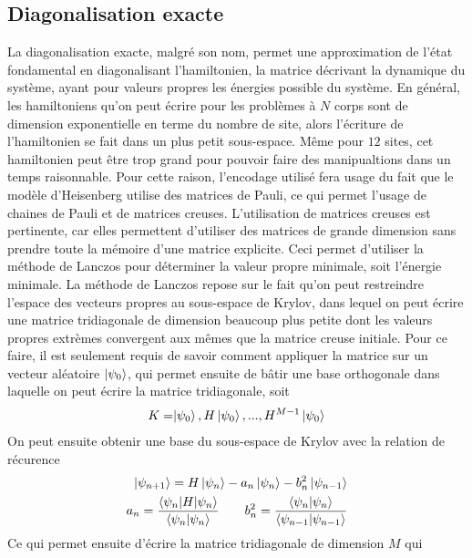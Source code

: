 \documentclass[../main.tex]{subfiles}
\begin{document}
  \subsection{Diagonalisation exacte} %
  \label{sub:Diagonalisation exacte}
    La diagonalisation exacte, malgré son nom, permet une approximation de l'état
    fondamental en diagonalisant l'hamiltonien, la matrice décrivant la dynamique
    du système, ayant pour valeurs propres les énergies possible du système.
    En général, les hamiltoniens qu'on peut écrire pour les problèmes
    à $N$ corps
    sont de dimension exponentielle en terme du nombre de site,
    alors l'écriture de
    l'hamiltonien se fait dans un plus petit sous-espace. Même pour $12$ sites,
    cet hamiltonien peut être trop grand pour pouvoir faire des manipualtions
    dans un temps raisonnable. Pour cette raison, l'encodage utilisé fera usage
    du fait que le modèle d'Heisenberg utilise des matrices de Pauli, ce qui
    permet l'usage de chaines de Pauli et de matrices creuses. L'utilisation
    de matrices creuses est pertinente, car elles permettent d'utiliser des matrices
    de grande dimension sans prendre toute la mémoire d'une matrice explicite.
    Ceci permet d'utiliser la méthode de Lanczos pour déterminer la valeur
    propre minimale, soit l'énergie minimale\cite{senech}. La méthode de Lanczos repose sur
    le fait qu'on peut restreindre l'espace des vecteurs propres au sous-espace
    de Krylov, dans lequel on peut écrire une matrice tridiagonale de dimension
    beaucoup plus petite dont les valeurs propres extrèmes convergent aux mêmes
    que la matrice creuse initiale\cite{livreboboche}. Pour ce faire, il est seulement requis de
    savoir comment appliquer la matrice sur un vecteur aléatoire $\ket{\psi_0}$,
    qui permet ensuite de bâtir une base orthogonale dans laquelle on peut écrire
    la matrice tridiagonale, soit
    \begin{align}
        K&=\span{\ket{\psi_0},H\ket{\psi_0},...,H^{M-1}\ket{\psi_0}}
    \end{align}
    On peut ensuite obtenir une base du sous-espace de Krylov avec la relation
    de récurence
    \begin{align}
        \ket{\psi_{n+1}}=H\ket{\psi_n}-a_n\ket{\psi_n}-b^2_n\ket{\psi_{n-1}}\\
        a_n=\frac{\expval{\psi_n|H|\psi_n}}{\braket{\psi_n}{\psi_n}}\qquad
        b^2_n=\frac{\braket{\psi_n}{\psi_n}}{\braket{\psi_{n-1}}{\psi_{n-1}}}
    \end{align}
    Ce qui permet ensuite d'écrire la matrice tridiagonale de dimension $M$ qui
\end{document}
